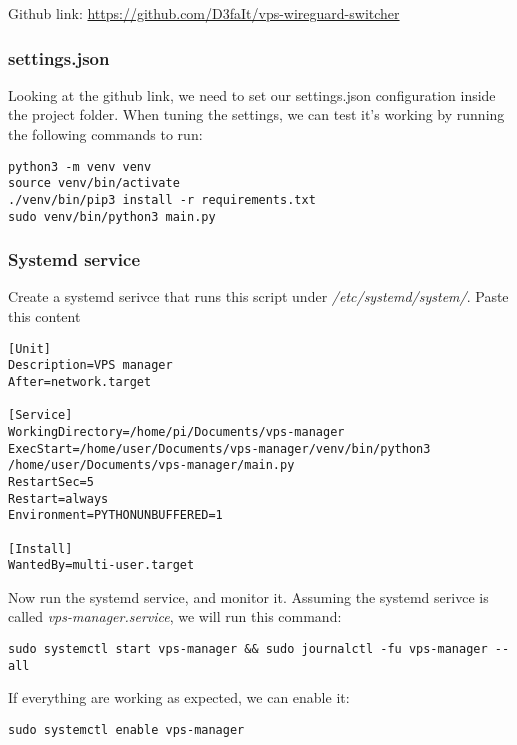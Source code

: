 \documentclass[letterpaper, 11pt]{article}
\begin{document}
Github link: \url{https://github.com/D3faIt/vps-wireguard-switcher}

\subsubsection{settings.json}
\label{sec:org7149173}
Looking at the github link, we need to set our settings.json configuration inside the project folder.
When tuning the settings, we can test it's working by running the following commands to run:

\begin{verbatim}
python3 -m venv venv
source venv/bin/activate
./venv/bin/pip3 install -r requirements.txt
sudo venv/bin/python3 main.py
\end{verbatim}

\subsubsection{Systemd service}
\label{sec:org90d3dff}

Create a systemd serivce that runs this script under \textit{/etc/systemd/system/}.
Paste this content
\begin{verbatim}
[Unit]
Description=VPS manager
After=network.target

[Service]
WorkingDirectory=/home/pi/Documents/vps-manager
ExecStart=/home/user/Documents/vps-manager/venv/bin/python3 /home/user/Documents/vps-manager/main.py
RestartSec=5
Restart=always
Environment=PYTHONUNBUFFERED=1

[Install]
WantedBy=multi-user.target
\end{verbatim}

Now run the systemd service, and monitor it. Assuming the systemd serivce is called \textit{vps-manager.service}, we will run this command:

\begin{verbatim}
sudo systemctl start vps-manager && sudo journalctl -fu vps-manager --all
\end{verbatim}

If everything are working as expected, we can enable it:
\begin{verbatim}
sudo systemctl enable vps-manager
\end{verbatim}
\end{document}
